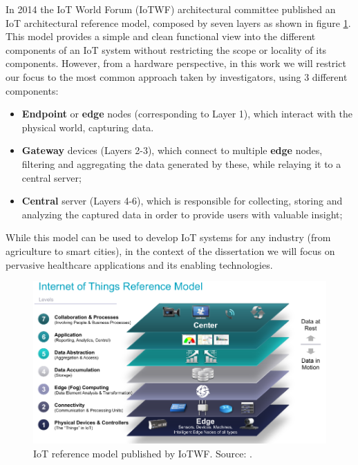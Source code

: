 In 2014 the \acs{IoT} World Forum (IoTWF) architectural committee published an \acs{IoT} architectural reference model, composed by seven layers as shown in figure \ref{fig:iotwf-referencemodel}. This model provides a simple and clean functional view into the different components of an \acs{IoT} system without restricting the scope or locality of its components. However, from a hardware perspective, in this work we will restrict our focus to the most common approach taken by investigators, using 3 different components: 

\begin{itemize}
    \item \textbf{Endpoint} or \textbf{edge} nodes (corresponding to Layer 1), which interact with the physical world, capturing data.
    \item \textbf{Gateway} devices (Layers 2-3), which connect to multiple \textbf{edge} nodes, filtering and aggregating the data generated by these, while relaying it to a central server; 
    \item \textbf{Central} server (Layers 4-6), which is responsible for collecting, storing and analyzing the captured data in order to provide users with valuable insight;
\end{itemize}

While this model can be used to develop IoT systems for any industry (from agriculture to smart cities), in the context of the dissertation we will focus on pervasive healthcare applications and its enabling technologies. 


\begin{figure}[H]
    \centering
    \includegraphics[width=0.85\linewidth]{images/iotwf-referencemodel.png}
    \caption[IoT reference model published by IoTWF.]{IoT reference model published by IoTWF. Source: \cite{Cisco2014}.}
    \label{fig:iotwf-referencemodel}
\end{figure}


